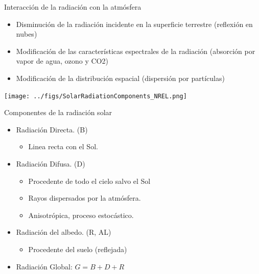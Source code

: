 \documentclass[xcolor={usenames,svgnames,dvipsnames}]{beamer}
\begin{document}
\begin{frame}[label={sec:orgb1e6559}]{Interacción de la radiación con la atmósfera}
\begin{itemize}
\item \alert{Disminución} de la radiación incidente en la superficie terrestre
(reflexión en nubes)

\item \alert{Modificación de las características espectrales} de la radiación
(absorción por vapor de agua, ozono y CO2)

\item \alert{Modificación de la distribución espacial} (dispersión por
partículas)
\end{itemize}

\begin{center}
\texttt{[image: ../figs/SolarRadiationComponents\_NREL.png]}
\end{center}
\end{frame}

\begin{frame}[label={sec:orgf33d163}]{Componentes de la radiación solar}
\begin{itemize}
\item \alert{Radiación Directa}. (B)

\begin{itemize}
\item Linea recta con el Sol.
\end{itemize}

\item \alert{Radiación Difusa}. (D)

\begin{itemize}
\item Procedente de todo el cielo salvo el Sol

\item Rayos dispersados por la atmósfera.

\item Anisotrópica, proceso estocástico.
\end{itemize}

\item \alert{Radiación del albedo}. (R, AL)

\begin{itemize}
\item Procedente del suelo (reflejada)
\end{itemize}

\item \alert{Radiación Global:} \(G=B+D+R\)
\end{itemize}
\end{frame}
\end{document}
